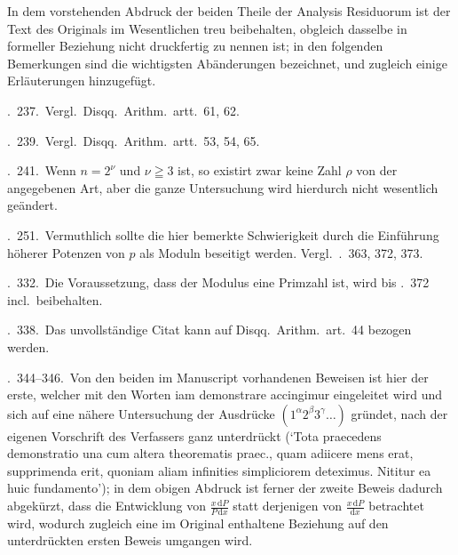 In dem vorstehenden Abdruck der beiden Theile der Analysis Residuorum ist der Text des Originals im Wesentlichen treu beibehalten, obgleich dasselbe in formeller Beziehung nicht druckfertig zu nennen ist; in den folgenden Bemerkungen sind die wichtigsten Abänderungen bezeichnet, und zugleich einige Erläuterungen hinzugefügt.

\textsection.\ 237.\ Vergl.\ Disqq.\ Arithm.\ artt.\ 61, 62.

\textsection.\ 239.\ Vergl.\ Disqq.\ Arithm.\ artt.\ 53, 54, 65.

\textsection.\ 241.\ Wenn $n=2^\nu$ und $\nu\geqq3$ ist, so existirt zwar keine Zahl $\rho$ von der angegebenen Art, aber die ganze Untersuchung wird hierdurch nicht wesentlich geändert.

\textsection.\ 251.\ Vermuthlich sollte die hier bemerkte Schwierigkeit durch die Einführung höherer Potenzen von $p$ als Moduln beseitigt werden. Vergl.\ \textsection\textsection.\ 363, 372, 373.

\textsection.\ 332.\ Die Voraussetzung, dass der Modulus eine Primzahl ist, wird bis \textsection.\ 372 incl.\ beibehalten.

\textsection.\ 338.\ Das unvollständige Citat kann auf Disqq.\ Arithm.\ art.\ 44 bezogen werden.

\textsection\textsection.\ 344--346.\ Von den beiden im Manuscript vorhandenen Beweisen ist hier der erste, welcher mit den Worten iam demonstrare accingimur eingeleitet wird und sich auf eine nähere Untersuchung der Ausdrücke $(1^\alpha2^\beta3^\gamma\ldots)$ gründet, nach der eigenen Vorschrift des Verfassers ganz unterdrückt (`Tota praecedens demonstratio una cum altera theorematis praec., quam adiicere mens erat, supprimenda erit, quoniam aliam infinities simpliciorem deteximus. Nititur ea huic fundamento'); in dem obigen Abdruck ist ferner der zweite Beweis dadurch abgekürzt, dass die Entwicklung von $\frac{x\,\mathrm{d}P}{P\,\mathrm{d}x}$ statt derjenigen von $\frac{x\,\mathrm{d}P}{\mathrm{d}x}$ betrachtet wird, wodurch zugleich eine im Original enthaltene Beziehung auf den unterdrückten ersten Beweis umgangen wird.

